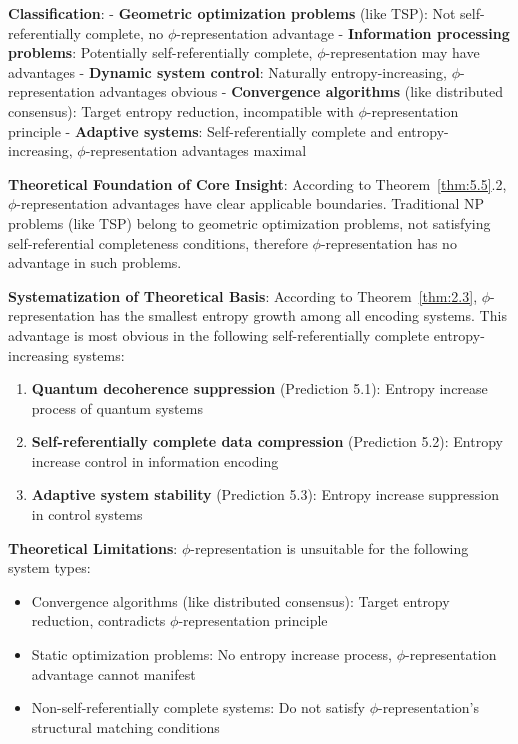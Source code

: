    \textbf{Classification}:
   - \textbf{Geometric optimization problems} (like TSP): Not self-referentially complete, no $\phi$-representation advantage
   - \textbf{Information processing problems}: Potentially self-referentially complete, $\phi$-representation may have advantages
   - \textbf{Dynamic system control}: Naturally entropy-increasing, $\phi$-representation advantages obvious
   - \textbf{Convergence algorithms} (like distributed consensus): Target entropy reduction, incompatible with $\phi$-representation principle
   - \textbf{Adaptive systems}: Self-referentially complete and entropy-increasing, $\phi$-representation advantages maximal

\textbf{Theoretical Foundation of Core Insight}:
According to Theorem~\ref{thm:5.5}.2, $\phi$-representation advantages have clear applicable boundaries. Traditional NP problems (like TSP) belong to geometric optimization problems, not satisfying self-referential completeness conditions, therefore $\phi$-representation has no advantage in such problems.

\textbf{Systematization of Theoretical Basis}:
According to Theorem~\ref{thm:2.3}, $\phi$-representation has the smallest entropy growth among all encoding systems. This advantage is most obvious in the following self-referentially complete entropy-increasing systems:

\begin{enumerate}
\item \textbf{Quantum decoherence suppression} (Prediction 5.1): Entropy increase process of quantum systems
\item \textbf{Self-referentially complete data compression} (Prediction 5.2): Entropy increase control in information encoding
\item \textbf{Adaptive system stability} (Prediction 5.3): Entropy increase suppression in control systems
\end{enumerate}

\textbf{Theoretical Limitations}:
$\phi$-representation is unsuitable for the following system types:
\begin{itemize}
\item Convergence algorithms (like distributed consensus): Target entropy reduction, contradicts $\phi$-representation principle
\item Static optimization problems: No entropy increase process, $\phi$-representation advantage cannot manifest
\item Non-self-referentially complete systems: Do not satisfy $\phi$-representation's structural matching conditions
\end{itemize}

